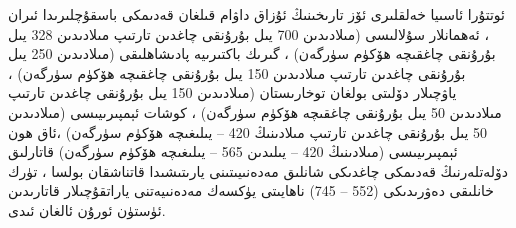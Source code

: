 \documentclass[a4paper]{article}
\begin{document}
\begin{flushright}



ئوتتۇرا ئاسىيا خەلقلىرى ئۆز تارىخىنىڭ ئۇزاق داۋام قىلغان قەدىمكى باسقۇچلىرىدا ئىران ، ئەھمانلار سۇلالىسى (مىلادىدىن 700 يىل بۇرۇنقى چاغدىن تارتىپ مىلادىدىن 328 يىل بۇرۇنقى چاغقىچە ھۆكۈم سۈرگەن) ، گىرىك باكتىرىيە پادىشاھلىقى (مىلادىدىن 250 يىل بۇرۇنقى چاغدىن تارتىپ مىلادىدىن 150 يىل بۇرۇنقى چاغقىچە ھۆكۈم سۈرگەن) ، ياۋچىلار دۆلىتى بولغان توخارىستان (مىلادىدىن 150 يىل بۇرۇنقى چاغدىن تارتىپ مىلادىدىن 50 يىل بۇرۇنقى چاغقىچە ھۆكۈم سۈرگەن) ، كوشات ئېمپىرىيىسى (مىلادىدىن 50 يىل بۇرۇنقى چاغدىن تارتىپ مىلادىنىڭ 420 – يىلىغىچە ھۆكۈم سۈرگەن) ،ئاق ھون ئېمپىرىيىسى (مىلادىنىڭ 420 – يىلىدىن 565 – يىلىغىچە ھۆكۈم سۈرگەن) قاتارلىق دۆلەتلەرنىڭ قەدىمكى چاغدىكى شانلىق مەدەنىيىتىنى يارىتىشىدا قاتناشقان بولسا ، تۈرك خانلىقى دەۋرىدىكى (552 – 745) ناھايىتى يۈكسەك مەدەنىيەتنى ياراتقۇچىلار قاتارىدىن ئۈستۈن ئورۇن ئالغان ئىدى.


\end{flushright}
\end{document}
